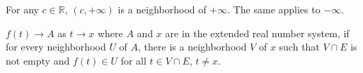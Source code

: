 \begin{definition}
For any $c\in \mathbb{R}$, $(c,+\infty)$ is a neighborhood of $+\infty$. The same applies to $-\infty$.
\end{definition}

\begin{definition}
$f(t)\to A$ as $t\to x$ where $A$ and $x$ are in the extended real number system, if for every neighborhood $U$ of $A$, there is a neighborhood $V$ of $x$ such that $V\cap E$ is not empty and $f(t)\in U$ for all $t\in V\cap E$, $t\neq x$.
\end{definition}

\clearpage